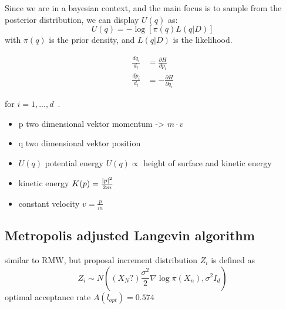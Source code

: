Since we are in a bayesian context, and the main focus is to sample from the posterior distribution, we can display $U(q)$ as: 
\[
U(q) = -\log[\pi(q)L(q|D)]
\]
with $\pi(q)$ is the prior density, and $L(q|D)$ is the likelihood.



\begin{align*}
    \frac{dq_i}{d_t}&=\frac{\partial H}{\partial p_i} \\
    \frac{dp_i}{d_t}&=-\frac{\partial H}{\partial q_i}
\end{align*}

for $i=1,...,d$~\cite{MR2858447}. 


  

\begin{itemize}
    \item p two dimensional vektor momentum -> $m\cdot v$
    \item q two dimensional vektor position 
    \item $U(q)$ potential energy $U(q)\propto$ height of surface and kinetic energy
    \item kinetic energy $K(p)=\frac{\left\lvert p\right\rvert^2}{2m}$
    \item constant velocity $v=\frac{p}{m}$
\end{itemize}   
\subsection{Metropolis adjusted Langevin algorithm}
 
similar to RMW, but proposal increment distribution $Z_i$ is defined as 
\[
Z_i \sim N((X_N?)\frac{\sigma^2}{2}\nabla\log\pi(X_n),\sigma^2I_d)
\]
optimal acceptance rate $A(l_{opt})=0.574$

